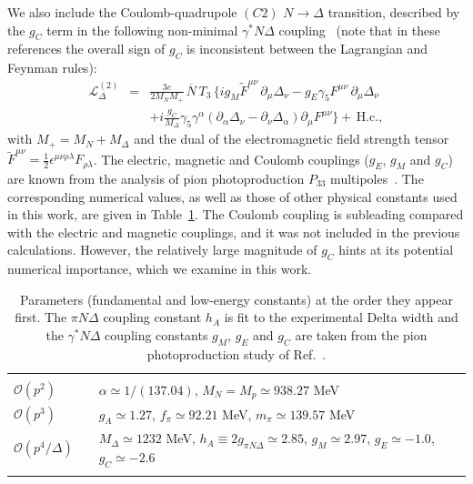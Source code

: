 \documentclass[12pt,preprint,tightenlines,
showpacs,preprintnumbers,amsmath,amssymb,
a4paper,nofootinbib]{revtex4-1}
\def\bea{\begin{eqnarray}}
\def\eea{\end{eqnarray}}
\def\eqlab#1{\label{eq:#1}}
\def\nn{\nonumber}
\begin{document}
We also include the Coulomb-quadrupole $(C2)$ $N\to \Delta$ transition,
described by the $g_C$ term in the following non-minimal $\gamma^* N \Delta$ coupling~\cite{Pascalutsa:2005vq,Pascalutsa:2005ts}
(note that in these references the overall sign of $g_C$ is inconsistent between the Lagrangian and Feynman rules):
\bea
\mathcal{L}^{(2)}_\Delta &=&  \frac{3e}{2M_N M_+}\,\overline N\, T_3\,\Big\{
i g_M  \tilde F^{\mu\nu} \,\partial_{\mu}\Delta_\nu- g_E \gamma_5 F^{\mu\nu}\,\partial_{\mu}\Delta_\nu\eqlab{gammaNDeltaLag}\\
&& +i \frac{g_C}{M_\Delta}\gamma_5 \gamma^\alpha (\partial_\alpha \Delta_\nu-\partial_\nu \Delta_\alpha)\partial_\mu F^{\mu \nu}\Big\}+\,\mbox{H.c.},
\nn
\eea
with $M_+=M_N+M_\Delta$ and the dual of the electromagnetic field strength tensor
 $\tilde F^{\mu\nu}=\frac{1}{2}\epsilon^{\mu\nu\rho\lambda}F_{\rho\lambda}$.
The electric, magnetic and Coulomb couplings ($g_E$, $g_M$ and $g_C$)
are known from the analysis of pion photoproduction $P_{33}$ multipoles~\cite{Pascalutsa:2005ts}.
The corresponding numerical values, as well as those of other physical constants used in this work, are given in Table~\ref{tab:constants}. The Coulomb coupling is subleading
compared with the electric and magnetic couplings, and it was not included in the previous calculations.
However, the relatively large magnitude of $g_C$ hints at its potential numerical importance,
which we examine in this work.

\begin{table}[b]
\caption{Parameters (fundamental and low-energy constants) \cite{Agashe:2014kda} at the order they appear first. The $\pi N\Delta$ coupling constant $h_A$ is fit to the experimental Delta width and the $\gamma^* N \Delta$ coupling constants $g_M$, $g_E$ and $g_C$ are taken from the pion photoproduction study of Ref.~\cite{Pascalutsa:2005vq}.\label{tab:constants}} 
\begin{tabular}{lp{0.3cm}l}
\hline\\
$\mathcal{O}(p^2)$&&$\alpha\simeq 1/(137.04)$, $M_N=M_p\simeq 938.27$ MeV\\
$\mathcal{O}(p^3)$&&$g_A\simeq 1.27$, $f_\pi\simeq 92.21$ MeV, $m_\pi\simeq 139.57$ MeV \\
$\mathcal{O}(p^4/\varDelta)$&&$M_\Delta\simeq 1232$ MeV, $h_A\equiv 2g_{\pi N \Delta}\simeq 2.85$, $g_M\simeq 2.97$, $g_E\simeq -1.0$, $g_C\simeq -2.6$\\
\\
\hline
\end{tabular}
\end{table}
\end{document}
